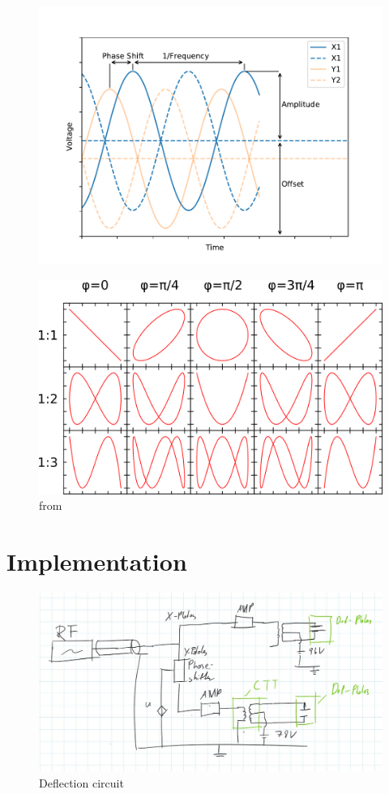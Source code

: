 \begin{figure}
	\centering
	\includegraphics[width=0.7\linewidth]{Chapters/Deflection/VoltageAspects}
	\caption{}
	\label{fig:VoltageAspects}
\end{figure}

\begin{figure}
	\centering
	\includegraphics[width=0.7\linewidth]{Chapters/Deflection/Lissajous}
	\caption{ from \cite{Wikipedia Lissajous}}
	\label{fig:Lissajous}
\end{figure}

\section{Implementation}

\begin{figure}
	\centering
	\includegraphics[width=0.7\linewidth]{Chapters/Deflection/deflec_circuit}
	\caption{Deflection circuit}
	\label{fig:deflec_circuit}
\end{figure}

